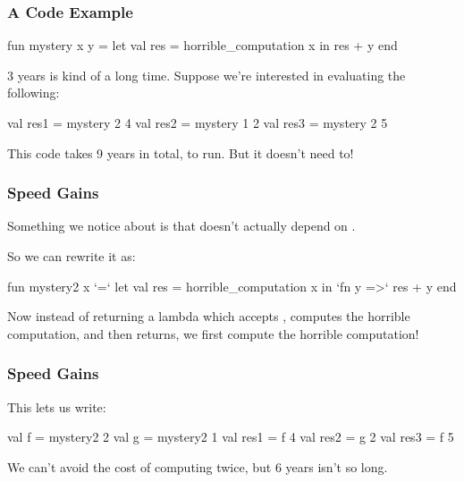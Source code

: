 \documentclass[aspectratio=169]{beamer}
\begin{document}
\begin{frame}[fragile]
  \frametitle{A Code Example}

  \begin{codeblock}
    fun mystery x y =
      let
        val res = horrible_computation x
      in
        res + y
      end 
  \end{codeblock}

  \pause
  \vspace{\fill}

  3 years is kind of a long time. Suppose we're interested in evaluating the following:

  \begin{codeblock}
    val res1 = mystery 2 4
    val res2 = mystery 1 2
    val res3 = mystery 2 5
  \end{codeblock}

  \pause
  \vspace{\fill}

  This code takes 9 years in total, to run. But it doesn't need to!
\end{frame}

\begin{frame}[fragile]
  \frametitle{Speed Gains}

  Something we notice about  is that
   doesn't actually depend on .

  \pause
  \vspace{\fill}

  So we can rewrite it as:
  \begin{codeblock}
    fun mystery2 x `=`
      let
        val res = horrible_computation x
      in
        `fn y =>` res + y
      end 
  \end{codeblock}

  \pause
  \vspace{\fill}

  Now instead of returning a lambda which accepts , computes the horrible 
  computation, and then returns, we first compute the horrible computation!
\end{frame}

\begin{frame}[fragile]
  \frametitle{Speed Gains}

  This lets us write:

  \pause
  \begin{codeblock}
    val f = mystery2 2
    val g = mystery2 1
    val res1 = f 4
    val res2 = g 2
    val res3 = f 5
  \end{codeblock}

  \pause
  \vspace{\fill}

  We can't avoid the cost of computing  twice, but 6 years isn't so long.
\end{frame}
\end{document}
